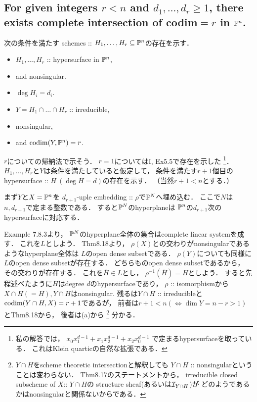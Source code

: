 \documentclass[a4paper]{jsarticle}
\begin{document}
    \subsection{For given integers $r<n$ and $d_1, \dots, d_r \geq 1$,
        there exists complete intersection of codim$=r$ in $\mathbb{P}^n$.}
    次の条件を満たす schemes :: $H_1,\dots,H_r \subseteq \mathbb{P}^n$の存在を示す．
    \begin{itemize}
        \item $H_1,\dots,H_r$ :: hypersurface in $\mathbb{P}^n$,
        \item and nonsingular.
        \item $\deg H_i=d_i$.
        \item $Y=H_1 \cap \dots \cap H_r$ :: irreducible,
        \item nonsingular,
        \item and $\operatorname{codim}(Y, \mathbb{P}^n)=r$.
    \end{itemize}

    $r$についての帰納法で示そう．
    $r=1$についてはI, Ex5.5で存在を示した
    \footnote
    {
        私の解答では，
        $x_0 x_1^{d-1}+x_1 x_2^{d-1}+x_2 x_0^{d-1}$
        で定まるhypersurfaceを取っている．
        これはKlein quarticの自然な拡張である．
    }．
    $H_1,\dots,H_r$と$Y$は条件を満たしていると仮定して，
    条件を満たす$r+1$個目のhypersurface :: $H \ (\deg H=d)$の存在を示す．
    （当然$r+1<n$とする．）

    まず$Y$と$X=\mathbb{P}^n$を
    $d_{r+1}$-uple embedding :: $\rho$で$\mathbb{P}^N$へ埋め込む．
    ここで$N$は$n, d_{r+1}$で定まる整数である．
    すると$\mathbb{P}^N$のhyperplaneは
    $\mathbb{P}^n$の$d_{r+1}$次のhypersurfaceに対応する．

    Example 7.8.3より，
    $\mathbb{P}^N$のhyperplane全体の集合はcomplete linear systemを成す．
    これを$L$としよう．
    Thm8.18より，
    $\rho(X)$との交わりがnonsingularであるようなhyperplane全体は
    $L$のopen dense subsetである．
    $\rho(Y)$についても同様に$L$のopen dense subsetが存在する．
    どちらものopen dense subsetであるから，
    その交わりが存在する．
    これを$\bar{H} \in L$とし，
    $\rho^{-1}(\bar{H})=H$としよう．
    すると先程述べたように$H$はdegree $d$のhypersurfaceであり，
    $\rho$ :: isomorphismから$X \cap H(=H), Y \cap H$はnonsingular.
    残るは$Y \cap H$ :: irreducibleと$\operatorname{codim}(Y \cap H, X)=r+1$であるが，
    前者は$r+1<n (\iff \dim Y=n-r>1)$とThm8.18から，
    後者は(a)から
    \footnote
    {
        $Y \cap H$をscheme theoretic intersectionと解釈しても
        $Y \cap H$ :: nonsingularということは変わらない．
        Thm8.17のステートメントから，
        irreducible closed subscheme of $X$:: $Y \cap H$の
        structure sheaf(あるいは$\mathcal{I}_{Y \cap H}$)が
        どのようであるかはnonsingularと関係ないからである．
    }
    分かる．
\end{document}
